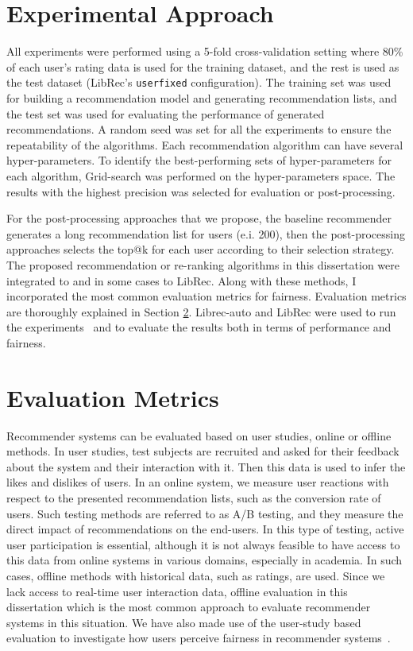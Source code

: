 \section{Experimental Approach}

    All experiments were performed using a 5-fold cross-validation setting where 80\% of each user's rating data is used for the training dataset, and the rest is used as the test dataset (LibRec's \texttt{userfixed} configuration). The training set was used for building a recommendation model and generating recommendation lists, and the test set was used for evaluating the performance of generated recommendations. A random seed was set for all the experiments to ensure the repeatability of the algorithms. Each recommendation algorithm can have several hyper-parameters. To identify the best-performing sets of hyper-parameters for each algorithm, Grid-search was performed on the hyper-parameters space. The results with the highest precision was selected for evaluation or post-processing.
    
    For the post-processing approaches that we propose, the baseline recommender generates a long recommendation list for users (e.i. 200), then the post-processing approaches selects the top@k for each user according to their selection strategy. The proposed recommendation or re-ranking algorithms in this dissertation were integrated to \libauto{} and in some cases to LibRec. Along with these methods, I incorporated the most common evaluation metrics for fairness. Evaluation metrics are thoroughly explained in Section \ref{sec:eval}. Librec-auto and LibRec were used to run the experiments~\cite{burke2020facct_libauto,Sonboli2020FARLA,guo2015librec,mansoury2019algorithm,mansoury2018automating} and to evaluate the results both in terms of performance and fairness.

\section{Evaluation Metrics}
\label{sec:eval}
    
    Recommender systems can be evaluated based on user studies, online or offline methods. In user studies, test subjects are recruited and asked for their feedback about the system and their interaction with it. Then this data is used to infer the likes and dislikes of users. In an online system, we measure user reactions with respect to the presented recommendation lists, such as the conversion rate of users. Such testing methods are referred to as A/B testing, and they measure the direct impact of recommendations on the end-users. In this type of testing, active user participation is essential, although it is not always feasible to have access to this data from online systems in various domains, especially in academia. In such cases, offline methods with historical data, such as ratings, are used. Since we lack access to real-time user interaction data, offline evaluation in this dissertation which is the most common approach to evaluate recommender systems in this situation. We have also made use of the user-study based evaluation to investigate how users perceive fairness in recommender systems~\cite{Sonboli2021transparency}.
    
